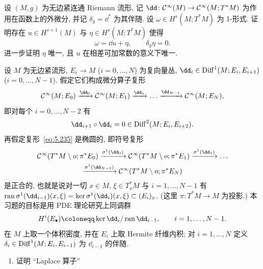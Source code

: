 \begin{exer}[Helmholtz 分解]\label{ex:5.38}
设 $(M, g)$ 为无边紧连通 Riemann 流形, 记 $\dd \colon \Smooth(M) \to \Smooth(M; T^* M)$ 为作用在函数上的外微分, 并记 $\delta_g = \dd^*$ 为其伴随. 设 $\omega \in H^s(M; T^* M)$ 为 1-形式. 证明存在 $u \in H^{s+1}(M)$ 与 $\eta \in H^s(M; T^* M)$ 使得
\begin{equation}\label{eq:5.234}
    \omega = \dd u + \eta, \qquad \delta_g \eta = 0.
\end{equation}
进一步证明 $\eta$ 唯一, 且 $u$ 在相差可加常数的意义下唯一.
\end{exer}

\begin{exer}[椭圆复形]\label{ex:5.39}
设 $M$ 为无边紧流形, $E_i \to M$ ($i = 0, \dots, N$) 为复向量丛, $\dd_i \in \Diff^1(M; E_i, E_{i+1})$ ($i = 0, \dots, N-1$). 假定它们构成微分算子复形
\begin{equation}\label{eq:5.235}
    \Smooth(M; E_0) \xrightarrow{\dd_0} \Smooth(M; E_1) \xrightarrow{\dd_1} \dots \xrightarrow{\dd_{N-1}} \Smooth(M; E_N),
\end{equation}
即对每个 $i = 0, \dots, N-2$ 有
\begin{equation}\label{eq:5.236}
    \dd_{i+1} \circ \dd_i = 0 \in \Diff^2(M; E_i, E_{i+2}).
\end{equation}
再假定复形~\eqref{eq:5.235} 是椭圆的, 即符号复形
\begin{equation}\label{eq:5.237}
    \begin{gathered}
        \Smooth(T^* M \setminus o; \pi^* E_0) \xrightarrow{\sigma^1(\dd_0)} \Smooth(T^* M \setminus o; \pi^* E_1) \xrightarrow{\sigma^1(\dd_1)} \dots \\
        \xrightarrow{\sigma^1(\dd_{N-1})} \Smooth(T^* M \setminus o; \pi^* E_N)
    \end{gathered}
\end{equation}
是正合的, 也就是说对一切 $x \in M$, $\xi \in T_x^* M$ 与 $i = 1, \dots, N-1$ 有 $\ran \sigma^1(\dd_{i-1})(x, \xi) = \ker \sigma^1(\dd_i)(x, \xi) \subset (E_i)_x$. (这里 $\pi \colon T^* M \to M$ 为投影.) 本习题的目标是用 PDE 理论研究上同调群
\begin{equation}\label{eq:5.238}
    H^i(E_\bullet) \defeq \ker \dd_i / \ran \dd_{i-1}, \qquad i = 1, \dots, N-1.
\end{equation}
在 $M$ 上取一个体积密度, 并在 $E_i$ 上取 Hermite 纤维内积; 对 $i = 1, \dots, N$ 定义 $\delta_i \in \operatorname{Diff}^1(M; E_i, E_{i-1})$ 为 $\dd_{i-1}$ 的伴随.
\begin{enumerate}
    \item 证明 ``Laplace 算子''

\end{enumerate}
\end{exer}
